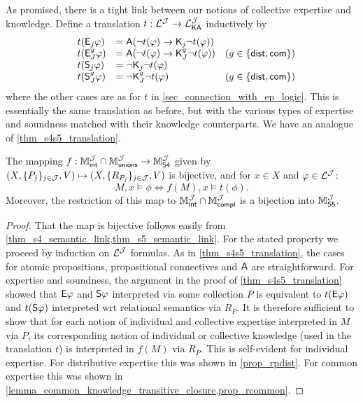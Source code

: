As promised, there is a tight link between our notions of collective
expertise and knowledge. Define a translation $t: \cLJ \to
\cLKAJ$ inductively by
\[
\begin{array}{lllr}
 &t(\E_j\phi) &= \A(\neg t(\phi) \limplies \K_j\neg t(\phi)) \\
 &t(\E_J^g\phi) &= \A(\neg t(\phi) \limplies \K_J^g\neg t(\phi))
     &(g \in \{\dist, \common\}) \\
 &t(\S_j\phi) &= \neg\K_j\neg t(\phi) \\
 &t(\S_J^g\phi) &= \neg\K_J^g\neg t(\phi)
     &(g \in \{\dist, \common\}) \\
\end{array}\]
where the other cases are as for $t$ in \cref{sec_connection_with_ep_logic}.
This is essentially the same translation as before, but with the various
types of expertise and soundness matched with their knowledge counterparts. We
have an analogue of \cref{thm_s4s5_translation}.

\begin{theorem}
\label{thm_collective_s4s5_translation}
The mapping $f: \MintJ \cap \MunionsJ \to \MsfourJ$ given by
$(X, \{P_j\}_{j \in \J}, V) \mapsto (X, \{R_{P_j}\}_{j \in \J}, V)$ is
bijective, and for $x \in X$ and $\phi \in \cLJ$:
\[
M, x \models \phi \iff f(M), x \models t(\phi).\]
Moreover, the restriction of this map to $\MintJ \cap \McomplJ$ is a
bijection into $\MsfiveJ$.
\end{theorem}

\begin{proof}
That the map is bijective follows easily from
\cref{thm_s4_semantic_link,thm_s5_semantic_link}. For
the stated property we proceed by induction on $\cLJ$ formulas. As in
\cref{thm_s4s5_translation}, the cases for atomic propositions,
propositional connectives and $\A$ are straightforward.
%
For expertise and soundness, the argument in the proof of
\cref{thm_s4s5_translation} showed that $\E\phi$ and
$\S\phi$ interpreted via some collection $P$ is
equivalent to $t(\E\phi)$ and $t(\S\phi)$ interpreted wrt
relational semantics via $R_P$.
%
It is therefore sufficient to show that for each notion of individual and
collective expertise interpreted in $M$ via $P$, its
corresponding notion of individual or collective knowledge (used in the
translation $t$) is interpreted in $f(M)$ via $R_P$.
This is self-evident for individual expertise. For distributive expertise
this was shown in \cref{prop_rpdist}. For common expertise this was
shown in \cref{lemma_common_knowledge_transitive_closure,prop_rcommon}.

\end{proof}


